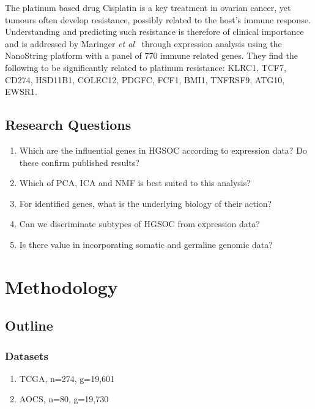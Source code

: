 \documentclass[tikz, 12pt,a4paper,oneside,fleqn]{article}
\newcommand{\etal}{{\em et al\/}}
\begin{document}
The platinum based drug Cisplatin is a key treatment in ovarian cancer, yet tumours often develop resistance, possibly related to the host's immune response.  Understanding and predicting such resistance is therefore of clinical importance and is addressed by Maringer \etal\ \cite{Mairinger2019} through expression analysis using the NanoString platform with a panel of 770 immune related genes.   They find the following to be significantly related to platinum resistance: KLRC1, TCF7, CD274, HSD11B1, COLEC12, PDGFC, FCF1, BMI1, TNFRSF9, ATG10, EWSR1.

\subsection{Research Questions}
\begin{enumerate}
\item
Which are the influential genes in HGSOC according
to expression data? Do these confirm published
results?
\item
Which of PCA, ICA and NMF is best suited to this
analysis?
\item
For identified genes, what is the underlying biology of
their action?
\item
Can we discriminate subtypes of HGSOC from
expression data?
\item
Is there value in incorporating somatic and germline
genomic data?
\end{enumerate}


\section{Methodology}

\subsection{Outline}

\subsubsection{Datasets}
\begin{enumerate}
\item TCGA, n=274, g=19,601
\item AOCS, n=80, g=19,730
\end{enumerate}
\end{document}
